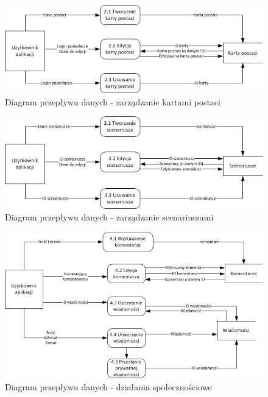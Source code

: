 \begin{figure}[h!]
\begin{center}
\includegraphics[scale=1]{./img/DFD-chars.png}
\caption[Diagram przepływu danych]{Diagram przepływu danych - zarządzanie kartami postaci}
\label{fig:DFD-chars}
\end{center}
\end{figure}

\begin{figure}[h!]
\begin{center}
\includegraphics[scale=1]{./img/DFD-scenarios.png}
\caption[Diagram przepływu danych]{Diagram przepływu danych - zarządzanie scenariuszami}
\label{fig:DFD-scenarios}
\end{center}
\end{figure}

\begin{figure}[h!]
\begin{center}
\includegraphics[scale=1]{./img/DFD-social.png}
\caption[Diagram przepływu danych]{Diagram przepływu danych - działania społecznościowe}
\label{fig:DFD-social}
\end{center}
\end{figure}

